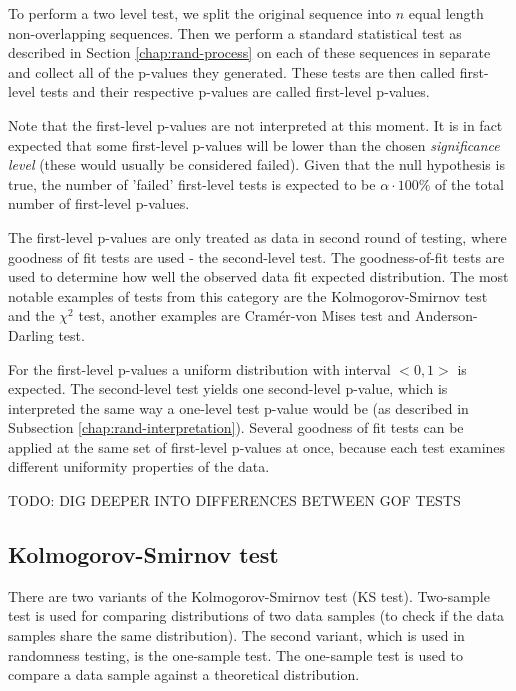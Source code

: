 \documentclass[
  digital,     %
  oneside,     %
  nosansbold,  %
  nocolorbold, %
  nolof,         %
  nolot,         %
]{fithesis4}
\begin{document}
To perform a two level test, we split the original sequence into $n$ equal length non-overlapping sequences. Then we perform a standard statistical test as described in Section \ref{chap:rand-process} on each of these sequences in separate and collect all of the p-values they generated. These tests are then called first-level tests and their respective p-values are called first-level p-values. 

Note that the first-level p-values are not interpreted at this moment. It is in fact expected that some first-level p-values will be lower than the chosen \emph{significance level} (these would usually be considered failed). Given that the null hypothesis is true, the number of 'failed' first-level tests is expected to be $\alpha\cdot100\%$ of the total number of first-level p-values.

The first-level p-values are only treated as data in second round of testing, where goodness of fit tests are used - the second-level test. The goodness-of-fit tests are used to determine how well the observed data fit expected distribution. The most notable examples of tests from this category are the Kolmogorov-Smirnov test and the $\chi^2$ test, another examples are Cramér-von Mises test and Anderson-Darling test. 

For the first-level p-values a uniform distribution with interval $<0,1>$ is expected. The second-level test yields one second-level p-value, which is interpreted the same way a one-level test p-value would be (as described in Subsection \ref{chap:rand-interpretation}). Several goodness of fit tests can be applied at the same set of first-level p-values at once, because each test examines different uniformity properties of the data.

TODO: DIG DEEPER INTO DIFFERENCES BETWEEN GOF TESTS

\subsection{Kolmogorov-Smirnov test}
There are two variants of the Kolmogorov-Smirnov test (KS test). Two-sample test is used for comparing distributions of two data samples (to check if the data samples share the same distribution). The second variant, which is used in randomness testing, is the one-sample test. The one-sample test is used to compare a data sample against a theoretical distribution.
\end{document}
